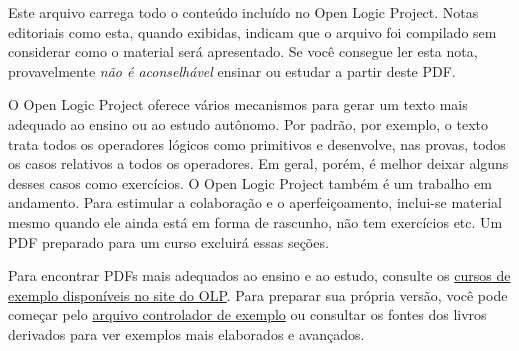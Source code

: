 \documentclass[../include/open-logic-part]{subfiles}
\begin{document}
\clearpage

\begin{editorial}
Este arquivo carrega todo o conteúdo incluído no Open Logic Project.
Notas editoriais como esta, quando exibidas, indicam que o arquivo foi
compilado sem considerar como o material será apresentado. Se você
consegue ler esta nota, provavelmente \emph{não é aconselhável} ensinar
ou estudar a partir deste PDF.

O Open Logic Project oferece vários mecanismos para gerar um texto mais
adequado ao ensino ou ao estudo autônomo. Por padrão, por exemplo, o texto
trata todos os operadores lógicos como primitivos e desenvolve, nas provas,
todos os casos relativos a todos os operadores. Em geral, porém, é melhor
deixar alguns desses casos como exercícios. O Open Logic Project também é
um trabalho em andamento. Para estimular a colaboração e o aperfeiçoamento,
inclui-se material mesmo quando ele ainda está em forma de rascunho, não tem
exercícios etc. Um PDF preparado para um curso excluirá essas seções.

Para encontrar PDFs mais adequados ao ensino e ao estudo, consulte os
\href{http://builds.openlogicproject.org/}{cursos de exemplo disponíveis
  no site do OLP}. Para preparar sua própria versão, você pode começar pelo
\href{https://github.com/OpenLogicProject/OpenLogic/tree/master/courses/sample}{arquivo
  controlador de exemplo} ou consultar os fontes dos livros derivados para
ver exemplos mais elaborados e avançados.
\end{editorial}


















\end{document}
